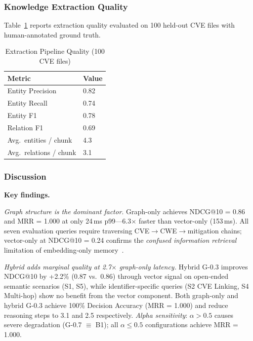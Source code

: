 \documentclass[conference]{IEEEtran}
\begin{document}
\subsubsection{Knowledge Extraction Quality}

Table~\ref{tab:extraction} reports extraction quality evaluated on 100
held-out CVE files with human-annotated ground truth.

\begin{table}[htbp]
  \centering
  \caption{Extraction Pipeline Quality (100 CVE files)}
  \label{tab:extraction}
  \begin{tabular}{ll}
    \toprule
    \textbf{Metric} & \textbf{Value} \\
    \midrule
    Entity Precision           & 0.82 \\
    Entity Recall              & 0.74 \\
    Entity F1                  & 0.78 \\
    Relation F1                & 0.69 \\
    Avg.\ entities / chunk     & 4.3  \\
    Avg.\ relations / chunk    & 3.1  \\
    \bottomrule
  \end{tabular}
\end{table}

\subsubsection{Discussion}

\textbf{Key findings.}

\emph{Graph structure is the dominant factor.}
Graph-only achieves NDCG@10 = 0.86 and MRR = 1.000 at only 24\,ms
p99---6.3$\times$ faster than vector-only (153\,ms).
All seven evaluation queries require traversing CVE$\to$CWE$\to$mitigation
chains; vector-only at NDCG@10 = 0.24 confirms the \emph{confused information
retrieval} limitation of embedding-only memory~\cite{deng2024pentestgpt}.

\emph{Hybrid adds marginal quality at 2.7$\times$ graph-only latency.}
Hybrid G-0.3 improves NDCG@10 by +2.2\% (0.87 vs.\ 0.86) through vector
signal on open-ended semantic scenarios (S1, S5), while identifier-specific
queries (S2 CVE Linking, S4 Multi-hop) show no benefit from the vector
component.
Both graph-only and hybrid G-0.3 achieve 100\% Decision Accuracy (MRR = 1.000)
and reduce reasoning steps to 3.1 and 2.5 respectively.
\emph{Alpha sensitivity}: $\alpha > 0.5$ causes severe degradation
(G-0.7 $\equiv$ B1); all $\alpha \le 0.5$ configurations achieve MRR = 1.000.
\end{document}
